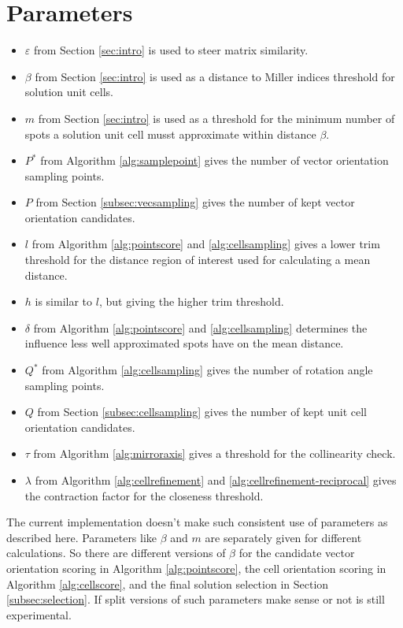 \documentclass[a4paper,10pt]{article}
\begin{document}
\section{Parameters}

\begin{itemize}
 \item $\varepsilon$ from Section \ref{sec:intro} is used to steer matrix similarity.
 \item $\beta$ from Section \ref{sec:intro} is used as a distance to Miller indices threshold for solution unit cells.
 \item $m$ from Section \ref{sec:intro} is used as a threshold for the minimum number of spots a solution unit cell musst approximate within distance $\beta$.
 \item $P^*$ from Algorithm \ref{alg:samplepoint} gives the number of vector orientation sampling points.
 \item $P$ from Section \ref{subsec:vecsampling} gives the number of kept vector orientation candidates.
 \item $l$ from Algorithm \ref{alg:pointscore} and \ref{alg:cellsampling} gives a lower trim threshold for the distance region of interest used for calculating a mean distance.
 \item $h$ is similar to $l$, but giving the higher trim threshold.
 \item $\delta$ from Algorithm \ref{alg:pointscore} and \ref{alg:cellsampling} determines the influence less well approximated spots have on the mean distance.
 \item $Q^*$ from Algorithm \ref{alg:cellsampling} gives the number of rotation angle sampling points.
 \item $Q$ from Section \ref{subsec:cellsampling} gives the number of kept unit cell orientation candidates.
 \item $\tau$ from Algorithm \ref{alg:mirroraxis} gives a threshold for the collinearity check.
 \item $\lambda$ from Algorithm \ref{alg:cellrefinement} and \ref{alg:cellrefinement-reciprocal} gives the contraction factor for the closeness threshold.
\end{itemize}

The current implementation doesn't make such consistent use of parameters as described here. Parameters like $\beta$ and $m$ are separately given for different calculations. So there are different versions of $\beta$ for the candidate vector orientation scoring in Algorithm \ref{alg:pointscore}, the cell orientation scoring in Algorithm \ref{alg:cellscore}, and the final solution selection in Section \ref{subsec:selection}. If split versions of such parameters make sense or not is still experimental.

\printbibliography
\end{document}
